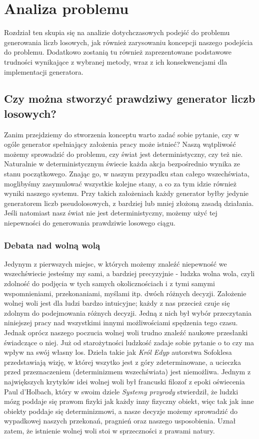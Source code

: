 \chapter{Analiza problemu}
\thispagestyle{chapterBeginStyle}
\label{rozdzial1}
Rozdział ten skupia się na analizie dotychczasowych podejść do problemu generowania liczb losowych, jak również zarysowaniu koncepcji naszego podejścia do problemu. Dodatkowo zostanią tu również zaprezentowane podstawowe trudności wynikające z wybranej metody, wraz z ich konsekwencjami dla implementacji generatora.

\section{Czy można stworzyć prawdziwy generator liczb losowych?}
Zanim przejdziemy do stworzenia konceptu warto zadać sobie pytanie, czy w ogóle generator spełniający założenia pracy może istnieć? Naszą wątpliwość możemy sprowadzić do problemu, czy świat jest deterministyczny, czy też nie. Naturalnie w deterministycznym świecie każda akcja bezpośrednio wynika ze stanu początkowego. Znając go, w naszym przypadku stan całego wszechświata, moglibyśmy zasymulować wszystkie kolejne stany, a co za tym idzie również wyniki naszego systemu. Przy takich założeniach każdy generator byłby jedynie generatorem liczb pseudolosowych, z bardziej lub mniej złożoną zasadą działania. Jeśli natomiast nasz świat nie jest deterministyczny, możemy użyć tej niepewności do generowania prawdziwie losowego ciągu.
\subsection{Debata nad wolną wolą}
Jedynym z pierwszych miejsc, w których możemy znaleźć niepewność we wszechświecie jesteśmy my sami, a bardziej precyzyjnie - ludzka wolna wola, czyli zdolność do podjęcia w tych samych okolicznościach i z tymi samymi wspomnieniami, przekonaniami, myślami itp. dwóch różnych decyzji. Założenie wolnej woli jest dla ludzi bardzo intuicyjne; każdy z nas przecież czuje się zdolnym do podejmowania różnych decyzji. Jedną z nich był wybór przeczytania niniejszej pracy nad wszystkimi innymi możliwościami spędzenia tego czasu. Jednak oprócz naszego poczucia wolnej woli trudno znaleźć naukowe przesłanki świadczące o niej. Już od starożytności ludzkość zadaje sobie pytanie o to czy ma wpływ na swój własny los. Dzieła takie jak \emph{Król Edyp} \cite{Edyp} autorstwa Sofoklesa przedstawiają wizję, w której wszytko jest z góry zdeterminowane, a ucieczka przed przeznaczeniem (determinizmem wszechświata) jest niemożliwa. Jednym z największych krytyków idei wolnej woli był francuski filozof z epoki oświecenia Paul d'Holbach, który w swoim dziele \emph{Systemy przyrody} \cite{baron} stwierdził, że ludzki mózg poddaje się prawom fizyki jak każdy inny fizyczny obiekt, więc tak jak inne obiekty poddaje się determinizmowi, a nasze decyzje możemy sprowadzić do wypadkowej naszych przekonań, pragnień oraz naszego usposobienia. Uznał zatem, że istnienie wolnej woli stoi w sprzeczności z prawami natury.
